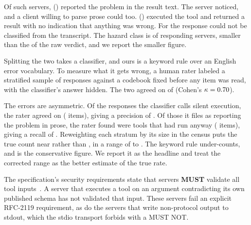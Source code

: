 Of \NAcceptInvalid{} such servers, \NInBandError{} (\InBandShare{}) reported the
problem in the result text. The server noticed, and a client willing to parse prose
could too. \NSilentExec{} (\SilentExecShare{}) executed the tool and returned a
result with no indication that anything was wrong. For \NUnclassifiable{} the
response could not be classified from the transcript. The hazard class is
\SilentExecRateCl{} of responding servers, smaller than the \NoTypecheckRateCl{} of the
raw verdict, and we report the smaller figure.

Splitting the two takes a classifier, and ours is a keyword rule over an English
error vocabulary. To measure what it gets wrong, a human rater labeled a stratified
sample of \ValN{} responses against a codebook fixed before any item was read, with
the classifier's answer hidden. The two agreed on \ValAgree{} of \ValN{}
(Cohen's \(\kappa = 0.70{}\)).

The errors are asymmetric. Of the responses the classifier calls silent execution,
the rater agreed on \ValSilExecPct{} (\ValSilN{} items), giving a precision of
\ValPrecision{}. Of those it files as reporting the problem in prose, the rater found
\ValInbExecPct{} were tools that had run anyway (\ValInbN{} items), giving a recall of
\ValRecall{}. Reweighting each stratum by its size in the census puts the true count
near \NSilentExecCorrected{} rather than \NSilentExec{}, in a range of
\NSilentExecCorrectedLo{} to \NSilentExecCorrectedHi{}. The keyword rule
under-counts, and \NSilentExec{} is the conservative figure. We report it as the
headline and treat the corrected range as the better estimate of the true rate.

The
specification's security requirements state that servers \textbf{MUST} validate all
tool inputs~\cite{mcpspec}. A server that executes a tool on an argument contradicting
its own published schema has not validated that input. These \NSilentExec{} servers
fail an explicit RFC-2119 requirement, as do the servers that write non-protocol
output to stdout, which the stdio transport forbids with a \textsf{MUST NOT}.

